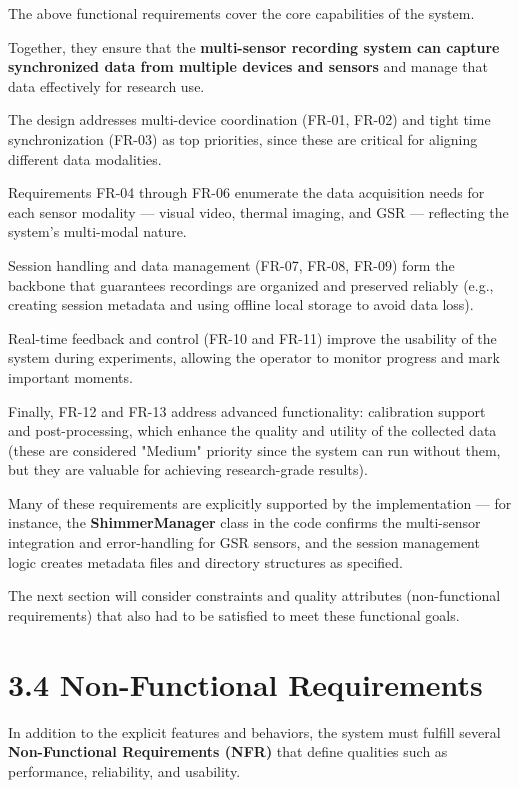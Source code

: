 The above functional requirements cover the core capabilities of the system.

Together, they ensure that the \textbf{multi-sensor recording system can capture synchronized data from multiple devices and sensors}
 and manage that data effectively for research use.

The design addresses multi-device coordination (FR-01, FR-02) and tight time synchronization (FR-03) as top priorities, since these are critical for aligning different data modalities.

Requirements FR-04 through FR-06 enumerate the data acquisition needs for each sensor modality --- visual video, thermal imaging, and GSR --- reflecting the system's multi-modal nature.

Session handling and data management (FR-07, FR-08, FR-09) form the backbone that guarantees recordings are organized and preserved reliably (e.g., creating session metadata and using offline local storage to avoid data loss).

Real-time feedback and control (FR-10 and FR-11) improve the usability of the system during experiments, allowing the operator to monitor progress and mark important moments.

Finally, FR-12 and FR-13 address advanced functionality: calibration support and post-processing, which enhance the quality and utility of the collected data (these are considered "Medium" priority since the system can run without them, but they are valuable for achieving research-grade results).

Many of these requirements are explicitly supported by the implementation --- for instance, the \textbf{ShimmerManager}
 class in the code confirms the multi-sensor integration and error-handling for GSR sensors, and the session management logic creates metadata files and directory structures as specified.

The next section will consider constraints and quality attributes (non-functional requirements) that also had to be satisfied to meet these functional goals.

\section{3.4 Non-Functional Requirements}

In addition to the explicit features and behaviors, the system must fulfill several \textbf{Non-Functional Requirements (NFR)}
 that define qualities such as performance, reliability, and usability.


